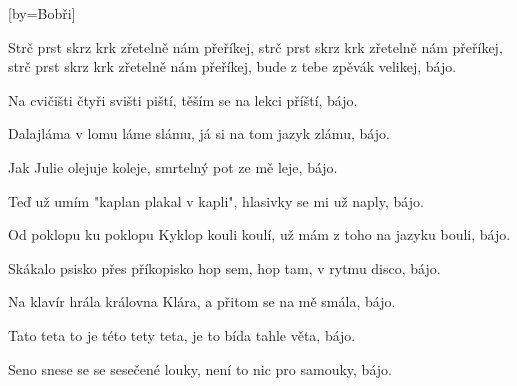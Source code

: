 [by={Bobři}]

\beginchorus{}
Strč prst skrz krk zřetelně nám přeříkej,
strč prst skrz krk zřetelně nám přeříkej,
strč prst skrz krk zřetelně nám přeříkej,
bude z tebe zpěvák velikej, bájo.
\endchorus{}

\beginverse{}
Na cvičišti čtyři svišti piští,
těším se na lekci příští, bájo.
\endverse{}

\beginverse{}
\chordsoff{}
Dalajláma v lomu láme slámu,
já si na tom jazyk zlámu, bájo.
\chordson{}
\endverse{}

\beginverse{}
\chordsoff{}
Jak Julie olejuje koleje,
smrtelný pot ze mě leje, bájo.
\chordson{}
\endverse{}

\beginverse{}
\chordsoff{}
Teď už umím "kaplan plakal v kapli",
hlasivky se mi už naply, bájo.
\chordson{}
\endverse{}

\beginverse{}
\chordsoff{}
Od poklopu ku poklopu Kyklop kouli koulí,
už mám z toho na jazyku bouli, bájo.
\chordson{}
\endverse{}

\beginverse{}
\chordsoff{}
Skákalo psisko přes příkopisko
hop sem, hop tam, v rytmu disco, bájo.
\chordson{}
\endverse{}

\beginverse{}
\chordsoff{}
Na klavír hrála královna Klára,
a přitom se na mě smála, bájo.
\chordson{}
\endverse{}

\beginverse{}
\chordsoff{}
Tato teta to je této tety teta,
je to bída tahle věta, bájo.
\chordson{}
\endverse{}

\beginverse{}
\chordsoff{}
Seno snese se se sesečené louky,
není to nic pro samouky, bájo.
\chordson{}
\endverse{}

\endsong{}
